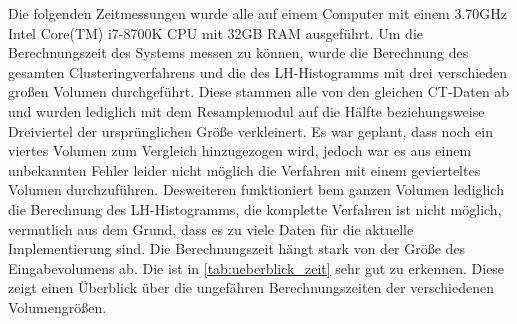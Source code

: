 Die folgenden Zeitmessungen wurde alle auf einem Computer mit einem 3.70GHz  Intel Core(TM) i7-8700K CPU mit 32GB RAM ausgeführt.
\newline
Um die Berechnungszeit des Systems messen zu können, wurde die Berechnung des gesamten Clusteringverfahrens und die des LH-Histogramms mit drei verschieden großen Volumen durchgeführt. Diese stammen alle von den gleichen CT-Daten ab und wurden lediglich  mit dem Resamplemodul auf die Hälfte beziehungsweise Dreiviertel der ursprünglichen Größe verkleinert. Es war geplant, dass noch ein viertes Volumen zum Vergleich hinzugezogen wird, jedoch war es aus einem unbekannten Fehler leider nicht möglich die Verfahren mit einem gevierteltes Volumen durchzuführen. Desweiteren funktioniert bem ganzen Volumen lediglich die Berechnung des LH-Histogramms, die komplette Verfahren ist nicht möglich, vermutlich aus dem Grund, dass es zu viele Daten für die aktuelle Implementierung sind.
\newline
Die Berechnungszeit hängt stark von der Größe des Eingabevolumens ab. Die ist in \autoref{tab:ueberblick_zeit} sehr gut zu erkennen. Diese zeigt einen Überblick über die ungefähren Berechnungszeiten der verschiedenen Volumengrößen.


\begin{table}[h]
\centering
{}
\caption{Überblick über die Berechnungszeiten der verschiedenen Volumengrößen}
\label{tab:ueberblick_zeit}
\end{table}


